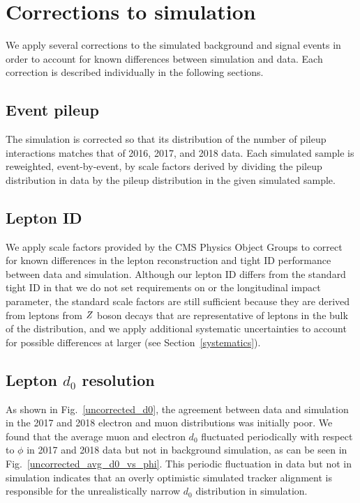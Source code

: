 \section{Corrections to simulation}
\label{corrections}

We apply several corrections to the simulated background and signal events in order to account for known differences between simulation and data. Each correction is described individually in the following sections.

\subsection{Event pileup}
The  simulation is corrected so that its distribution of the number of pileup interactions matches that of 2016, 2017, and 2018 data. Each simulated sample is reweighted, event-by-event, by scale factors derived by dividing the pileup distribution in data by the pileup distribution in the given simulated sample.

\subsection{Lepton ID}
We apply scale factors provided by the CMS Physics Object Groups to correct for known differences in the lepton reconstruction and tight ID performance between data and simulation. Although our lepton ID differs from the standard tight ID in that we do not set requirements on \ad or the longitudinal impact parameter, the standard scale factors are still sufficient because they are derived from leptons from $Z$ boson decays that are representative of leptons in the bulk of the \ad distribution, and we apply additional systematic uncertainties to account for possible differences at larger \ad (see Section~\ref{systematics}).

\subsection{Lepton $d_0$ resolution}
\label{d0_smearing}
As shown in Fig.~\ref{uncorrected_d0}, the agreement between data and simulation in the 2017 and 2018 electron and muon \ad distributions was initially poor. We found that the average muon and electron $d_0$ fluctuated periodically with respect to $\phi$ in 2017 and 2018 data but not in background simulation, as can be seen in Fig.~\ref{uncorrected_avg_d0_vs_phi}. This periodic fluctuation in data but not in simulation indicates that an overly optimistic simulated tracker alignment is responsible for the unrealistically narrow $d_0$ distribution in simulation.


